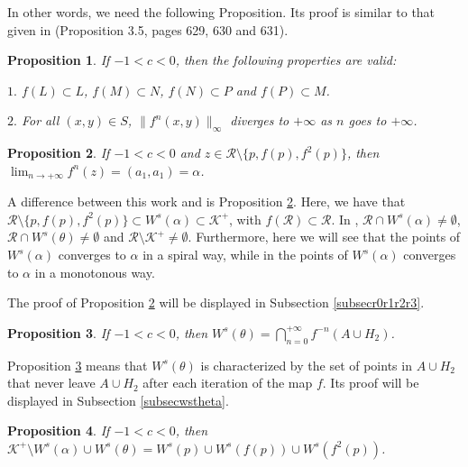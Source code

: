 \documentclass[11pt]{amsart}
\newtheorem{proposition}{Proposition}
\theoremstyle{definition}
\begin{document}
In other words, we need the following Proposition. Its proof is similar to that given in \cite{bcm} (Proposition 3.5, pages 629, 630 and 631).

\begin{proposition}
If $-1< c<0$, then the following properties are valid:
	
	\noindent $1.$ $f(L)\subset L$, $f(M)\subset N$, $f(N)\subset P$ and $f(P)\subset M$.
	
	\noindent $2.$ For all $(x,y)\in S$, $\|f^n(x,y)\|_\infty$ diverges to $+\infty$ as $n$ goes to $+\infty$.
	\label{propinf}
\end{proposition}



\begin{proposition}
If $-1<c<0$ and $z\in \mathcal{R}\setminus \{p,f(p),f^2(p)\}$, then $\displaystyle\lim_{n\to+\infty}f^n(z)=(a_1,a_1)=\alpha$. \label{propostion2}
\end{proposition}

A difference between this work and \cite{bcm} is Proposition \ref{propostion2}. Here, we have that $\mathcal{R}\setminus\{p,f(p),f^2(p)\}\subset W^s(\alpha)\subset \mathcal{K}^+$, with $f(\mathcal{R})\subset \mathcal{R}$. In \cite{bcm}, $\mathcal{R}\cap W^s(\alpha)\neq\emptyset$, $\mathcal{R}\cap W^s(\theta)\neq\emptyset$ and $\mathcal{R}\setminus\mathcal{K}^+\neq \emptyset$. Furthermore, here we will see that the points of $W^s(\alpha)$ converges to $\alpha$ in a spiral way, while in \cite{bcm} the points of $W^s(\alpha)$ converges to $\alpha$ in a  monotonous way.

The proof of Proposition \ref{propostion2} will be displayed in Subsection \ref{subsecr0r1r2r3}.

\begin{proposition} If $-1<c<0$, then \label{proposition3} $W^s(\theta)= \bigcap_{n=0}^{+\infty}f^{-n}(A\cup H_2)$.
\end{proposition}

Proposition \ref{proposition3} means that $W^s(\theta)$ is characterized by the set of points in $A\cup H_2$ that never leave $A\cup H_2$ after each iteration of the map $f$. Its proof will be displayed in Subsection \ref{subsecwstheta}.

\begin{proposition} \label{proposition4}
If $-1<c<0$, then $\mathcal{K}^+\setminus W^s(\alpha)\cup W^s(\theta)=W^s(p)\cup W^s(f(p))\cup W^s(f^2(p))$.
\end{proposition}
\end{document}
